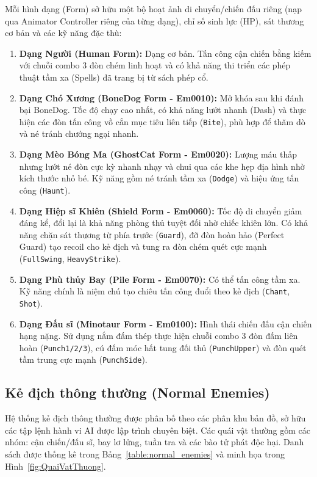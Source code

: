 \documentclass[../DoAn.tex]{subfiles}
\begin{document}
Mỗi hình dạng (Form) sở hữu một bộ hoạt ảnh di chuyển/chiến đấu riêng (nạp qua Animator Controller riêng của từng dạng), chỉ số sinh lực (HP), sát thương cơ bản và các kỹ năng đặc thù:
\begin{enumerate}
    \item \textbf{Dạng Người (Human Form):} Dạng cơ bản. Tấn công cận chiến bằng kiếm với chuỗi combo 3 đòn chém linh hoạt và có khả năng thi triển các phép thuật tầm xa (Spells) đã trang bị từ sách phép cổ.
    \item \textbf{Dạng Chó Xương (BoneDog Form - Em0010):} Mở khóa sau khi đánh bại BoneDog. Tốc độ chạy cao nhất, có khả năng lướt nhanh (Dash) và thực hiện các đòn tấn công vồ cắn mục tiêu liên tiếp (\texttt{Bite}), phù hợp để thăm dò và né tránh chướng ngại nhanh.
    \item \textbf{Dạng Mèo Bóng Ma (GhostCat Form - Em0020):} Lượng máu thấp nhưng lướt né đòn cực kỳ nhanh nhạy và chui qua các khe hẹp địa hình nhờ kích thước nhỏ bé. Kỹ năng gồm né tránh tầm xa (\texttt{Dodge}) và hiệu ứng tấn công (\texttt{Haunt}).
    \item \textbf{Dạng Hiệp sĩ Khiên (Shield Form - Em0060):} Tốc độ di chuyển giảm đáng kể, đổi lại là khả năng phòng thủ tuyệt đối nhờ chiếc khiên lớn. Có khả năng chặn sát thương từ phía trước (\texttt{Guard}), đỡ đòn hoàn hảo (Perfect Guard) tạo recoil cho kẻ địch và tung ra đòn chém quét cực mạnh (\texttt{FullSwing}, \texttt{HeavyStrike}).
    \item \textbf{Dạng Phù thủy Bay (Pile Form - Em0070):} Có thể tấn công tầm xa. Kỹ năng chính là niệm chú tạo chiêu tấn công đuổi theo kẻ địch (\texttt{Chant}, \texttt{Shot}).
    \item \textbf{Dạng Đấu sĩ (Minotaur Form - Em0100):} Hình thái chiến đấu cận chiến hạng nặng. Sử dụng nắm đấm thép thực hiện chuỗi combo 3 đòn đấm liên hoàn (\texttt{Punch1/2/3}), cú đấm móc hất tung đối thủ (\texttt{PunchUpper}) và đòn quét tầm trung cực mạnh (\texttt{PunchSide}).
\end{enumerate}

\subsection{Kẻ địch thông thường (Normal Enemies)}
\label{subsection:3.7.2}

Hệ thống kẻ địch thông thường được phân bố theo các phân khu bản đồ, sở hữu các tập lệnh hành vi AI được lập trình chuyên biệt. Các quái vật thường gồm các nhóm: cận chiến/đấu sĩ, bay lơ lửng, tuần tra và các bào tử phát độc hại. Danh sách được thống kê trong Bảng~\ref{table:normal_enemies} và minh họa trong Hình~\ref{fig:QuaiVatThuong}.
\end{document}
